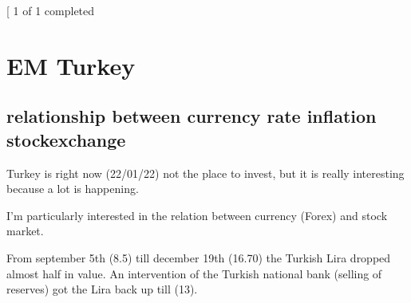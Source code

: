 \documentclass[letterpaper,10pt,english]{sphinxmanual}
\begin{document}
\begin{sphinxVerbatim}[commandchars=\\\{\}]
\end{sphinxVerbatim}

\noindent{}

\sphinxAtStartPar
{}
\begin{sphinxalltt}
{[}\sphinxstylestrong{*******************100\%*********************}{]}  1 of 1 completed
\end{sphinxalltt}

\begin{sphinxVerbatim}[commandchars=\\\{\}]
\end{sphinxVerbatim}

\noindent{}

\sphinxAtStartPar
{}


\chapter{EM Turkey}
\label{\detokenize{turkey:em-turkey}}\label{\detokenize{turkey::doc}}

\section{relationship between currency rate \sphinxhyphen{} inflation \sphinxhyphen{} stockexchange}
\label{\detokenize{turkey:relationship-between-currency-rate-inflation-stockexchange}}
\sphinxAtStartPar
Turkey is right now (22/01/22) not the place to invest, but it is really
interesting because a lot is happening.

\sphinxAtStartPar
I’m particularly interested in the relation between currency (Forex) and
stock market.

\sphinxAtStartPar
From september 5th (8.5) till december 19th (16.70) the Turkish Lira
dropped almost half in value. An intervention of the Turkish national
bank (selling of reserves) got the Lira back up till (13).
\end{document}
